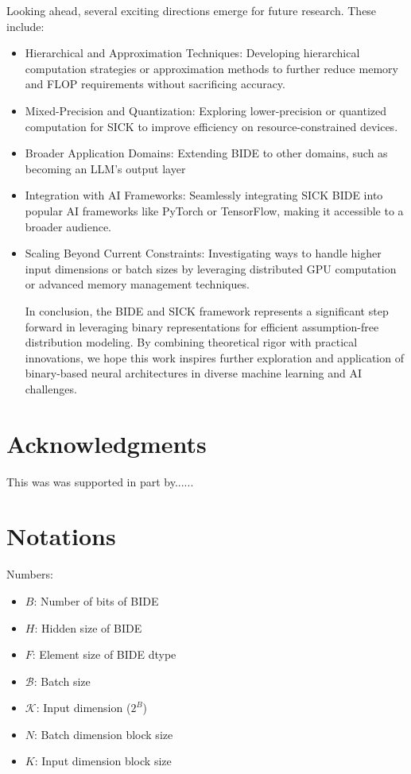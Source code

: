 \documentclass{article}
\begin{document}
Looking ahead, several exciting directions emerge for future research. These include:
\begin{itemize}
\item Hierarchical and Approximation Techniques: Developing hierarchical computation strategies or approximation methods to further reduce memory and FLOP requirements without sacrificing accuracy.
\item Mixed-Precision and Quantization: Exploring lower-precision or quantized computation for SICK to improve efficiency on resource-constrained devices.
\item Broader Application Domains: Extending BIDE to other domains, such as becoming an LLM's output layer
\item Integration with AI Frameworks: Seamlessly integrating SICK BIDE into popular AI frameworks like PyTorch or TensorFlow, making it accessible to a broader audience.
\item Scaling Beyond Current Constraints: Investigating ways to handle higher input dimensions or batch sizes by leveraging distributed GPU computation or advanced memory management techniques.

In conclusion, the BIDE and SICK framework represents a significant step forward in leveraging binary representations for efficient assumption-free distribution modeling. By combining theoretical rigor with practical innovations, we hope this work inspires further exploration and application of binary-based neural architectures in diverse machine learning and AI challenges.
\end{itemize}

\section*{Acknowledgments}
This was was supported in part by......

  
  

\appendix
\section{Notations}
Numbers:
\begin{itemize}
\item $B$: Number of bits of BIDE
\item $H$: Hidden size of BIDE
\item $F$: Element size of BIDE dtype
\item $\mathcal{B}$: Batch size
\item $\mathcal{K}$: Input dimension ($2^B$)
\item $N$: Batch dimension block size
\item $K$: Input dimension block size
\end{itemize}
\end{document}
